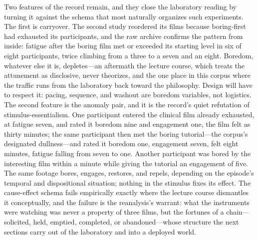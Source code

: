 Two features of the record remain, and they close the laboratory reading by turning it against the schema that most naturally organizes such experiments. The first is carryover. The second study reordered its films because boring-first had exhausted its participants, and the raw archive confirms the pattern from inside: fatigue after the boring film met or exceeded its starting level in six of eight participants, twice climbing from a three to a seven and an eight. Boredom, whatever else it is, depletes---an aftermath the lecture course, which treats the attunement as disclosive, never theorizes, and the one place in this corpus where the traffic runs from the laboratory back toward the philosophy. Design will have to respect it: pacing, sequence, and washout are boredom variables, not logistics. The second feature is the anomaly pair, and it is the record's quiet refutation of stimulus-essentialism. One participant entered the clinical film already exhausted, at fatigue seven, and rated it boredom nine and engagement one, the film felt as thirty minutes; the same participant then met the boring tutorial---the corpus's designated dullness---and rated it boredom one, engagement seven, felt eight minutes, fatigue falling from seven to one. Another participant was bored by the interesting film within a minute while giving the tutorial an engagement of five. The same footage bores, engages, restores, and repels, depending on the episode's temporal and dispositional situation; nothing in the stimulus fixes its effect. The cause-effect schema fails empirically exactly where the lecture course dismantles it conceptually, and the failure is the reanalysis's warrant: what the instruments were watching was never a property of three films, but the fortunes of a chain---solicited, held, emptied, completed, or abandoned---whose structure the next sections carry out of the laboratory and into a deployed world.

